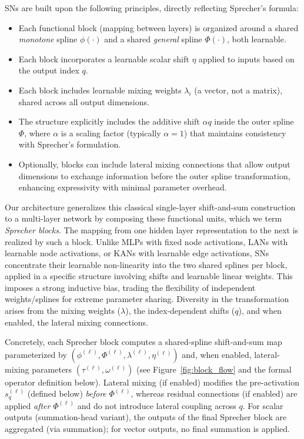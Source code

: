 \documentclass{article}
\theoremstyle{plain}
\theoremstyle{definition}
\theoremstyle{remark}
\begin{document}
SNs are built upon the following principles, directly reflecting Sprecher's formula:
\begin{itemize}
    \item Each functional block (mapping between layers) is organized around a shared \emph{monotone} spline $\phi(\cdot)$ and a shared \emph{general} spline $\Phi(\cdot)$, both learnable.
    \item Each block incorporates a learnable scalar shift $\eta$ applied to inputs based on the output index $q$.
    \item Each block includes learnable mixing weights $\lambda_{i}$ (a vector, not a matrix), shared across all output dimensions.
    \item The structure explicitly includes the additive shift $\alpha q$ inside the outer spline $\Phi$, where $\alpha$ is a scaling factor (typically $\alpha = 1$) that maintains consistency with Sprecher's formulation.
    \item Optionally, blocks can include lateral mixing connections that allow output dimensions to exchange information before the outer spline transformation, enhancing expressivity with minimal parameter overhead.
\end{itemize}
Our architecture generalizes this classical single-layer shift-and-sum construction to a multi-layer network by composing these functional units, which we term \emph{Sprecher blocks}. The mapping from one hidden layer representation to the next is realized by such a block. Unlike MLPs with fixed node activations, LANs with learnable node activations, or KANs with learnable edge activations, SNs concentrate their learnable non-linearity into the two shared splines per block, applied in a specific structure involving shifts and learnable linear weights. This imposes a strong inductive bias, trading the flexibility of independent weights/splines for extreme parameter sharing. Diversity in the transformation arises from the mixing weights ($\lambda$), the index-dependent shifts ($q$), and when enabled, the lateral mixing connections.

Concretely, each Sprecher block computes a shared-spline shift-and-sum map parameterized by $(\phi^{(\ell)},\Phi^{(\ell)},\lambda^{(\ell)},\eta^{(\ell)})$ and, when enabled, lateral-mixing parameters $(\tau^{(\ell)},\omega^{(\ell)})$ (see Figure~\ref{fig:block_flow} and the formal operator definition below).
Lateral mixing (if enabled) modifies the pre-activation $s_q^{(\ell)}$ (defined below) \emph{before} $\Phi^{(\ell)}$, whereas residual connections (if enabled) are applied \emph{after} $\Phi^{(\ell)}$ and do not introduce lateral coupling across $q$.
For scalar outputs (summation-head variant), the outputs of the final Sprecher block are aggregated (via summation); for vector outputs, no final summation is applied.
\end{document}
